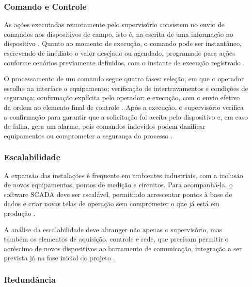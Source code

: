 \subsubsection{Comando e Controle}

\par As ações executadas remotamente pelo supervisório consistem no envio de comandos aos dispositivos de campo, isto é, na escrita de uma informação no dispositivo \cite{YADAV2020_SCADA_ARCHITECTURE_REVIEW}. Quanto ao momento de execução, o comando pode ser instantâneo, escrevendo de imediato o valor desejado ou agendado, programado para ações conforme cenários previamente definidos, com o instante de execução registrado \cite{ZANGHI2019_SCADA_CONCEITOS}.

\par O processamento de um comando segue quatro fases: seleção, em que o operador escolhe na interface o equipamento; verificação de intertravamentos e condições de segurança; confirmação explícita pelo operador; e execução, com o envio efetivo da ordem ao elemento final de controle \cite{ZANGHI2019_SCADA_CONCEITOS}. Após a execução, o supervisório verifica a confirmação para garantir que a solicitação foi aceita pelo dispositivo e, em caso de falha, gera um alarme, pois comandos indevidos podem danificar equipamentos ou comprometer a segurança do processo \cite{STOUFFER2015_NIST_ICS_SECURITY}.

\subsubsection{Escalabilidade}

\par A expansão das instalações é frequente em ambientes industriais, com a inclusão de novos equipamentos, pontos de medição e circuitos. Para acompanhá-la, o software SCADA deve ser escalável, permitindo acrescentar pontos à base de dados e criar novas telas de operação sem comprometer o que já está em produção \cite{ZANGHI2019_SCADA_CONCEITOS}.

\par A análise da escalabilidade deve abranger não apenas o supervisório, mas também os elementos de aquisição, controle e rede, que precisam permitir o acréscimo de novos dispositivos ao barramento de comunicação, integração a ser prevista já na fase inicial do projeto \cite{ZANGHI2019_SCADA_CONCEITOS}.

\subsubsection{Redundância}

